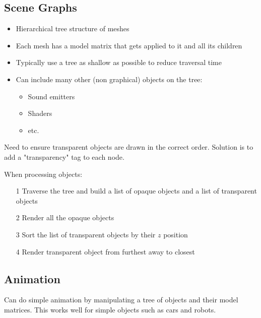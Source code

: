 \documentclass[a4paper]{article}
\begin{document}
\subsection{Scene Graphs}

\begin{itemize}
  \item
    Hierarchical tree structure of meshes

  \item
    Each mesh has a model matrix that gets applied to it and all its children

  \item
    Typically use a tree as shallow as possible to reduce traversal time

  \item
    Can include many other (non graphical) objects on the tree:

    \begin{itemize}
      \item Sound emitters
      \item Shaders
      \item etc.
    \end{itemize}

\end{itemize}

Need to ensure transparent objects are drawn in the correct order. Solution is
to add a "transparency" tag to each node.

When processing objects:

\begin{enumerate}
  \item[1]
    Traverse the tree and build a list of opaque objects and a list of
    transparent objects

  \item[2]
    Render all the opaque objects

  \item[3]
    Sort the list of transparent objects by their $z$ position

  \item[4]
    Render transparent object from furthest away to closest

\end{enumerate}

\subsection{Animation}

Can do simple animation by manipulating a tree of objects and their model
matrices. This works well for simple objects such as cars and robots.
\end{document}
